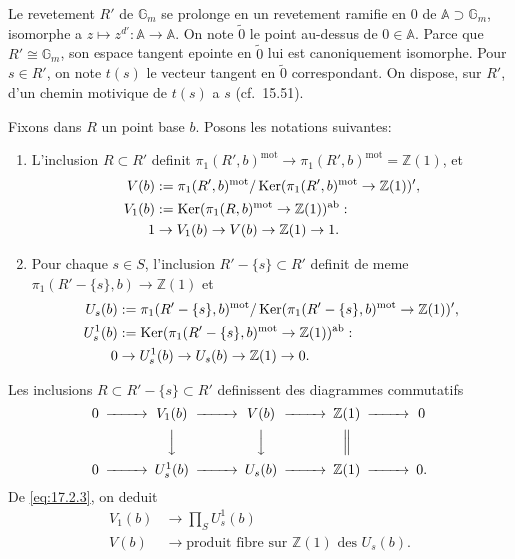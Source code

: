 \documentclass[12pt,a4paper]{article}
\theoremstyle{plain}
\theoremstyle{definition}
\theoremstyle{remark}
\DeclareMathOperator{\Ker}{Ker}
\newcommand{\mot}{\mathrm{mot}}
\newcommand{\Gm}{\mathbb{G}_m}
\newcommand{\ZZ}{\mathbb{Z}}
\newcommand{\GA}{\mathbb{A}}
\begin{document}
Le revetement $R'$ de $\Gm$ se prolonge en un revetement ramifie en
$0$ de $\GA \supset \Gm$, isomorphe a $z \mapsto z^{d'} : \GA \to \GA$.
On note $\tilde{0}$ le point au-dessus de $0 \in \GA$. Parce que
$R' \cong \Gm$, son espace tangent epointe en $\tilde{0}$ lui est
canoniquement isomorphe. Pour $s \in R'$, on note $t(s)$ le vecteur
tangent en $\tilde{0}$ correspondant. On dispose, sur $R'$, d'un chemin
motivique de $t(s)$ a $s$ (cf.\ 15.51).

Fixons dans $R$ un point base $b$. Posons les notations suivantes:
\begin{enumerate}
\item[(a)] L'inclusion $R \subset R'$ definit
$\pi_1(R',b)^\mot \to \pi_1(R',b)^\mot = \ZZ(1)$, et
\begin{align}
V(b) &:= \pi_1(R',b)^\mot/\Ker(\pi_1(R',b)^\mot \to \ZZ(1))', \notag \\
V_1(b) &:= \Ker(\pi_1(R,b)^\mot \to \ZZ(1))^{\mathrm{ab}}: \notag \\
1 &\to V_1(b) \to V(b) \to \ZZ(1) \to 1. \label{eq:17.2.1}
\end{align}
\item[(b)] Pour chaque $s \in S$, l'inclusion $R' - \{s\} \subset R'$
definit de meme $\pi_1(R'-\{s\},b) \to \ZZ(1)$ et
\begin{align}
U_s(b) &:= \pi_1(R'-\{s\},b)^\mot/\Ker(\pi_1(R'-\{s\},b)^\mot \to \ZZ(1))', \notag \\
U_s^1(b) &:= \Ker(\pi_1(R'-\{s\},b)^\mot \to \ZZ(1))^{\mathrm{ab}}: \notag \\
0 &\to U_s^1(b) \to U_s(b) \to \ZZ(1) \to 0. \label{eq:17.2.2}
\end{align}
\end{enumerate}
Les inclusions $R \subset R' - \{s\} \subset R'$ definissent des
diagrammes commutatifs
\begin{equation}\label{eq:17.2.3}
\begin{CD}
0 @>>> V_1(b) @>>> V(b) @>>> \ZZ(1) @>>> 0 \\
@. @VVV @VVV @| \\
0 @>>> U_s^1(b) @>>> U_s(b) @>>> \ZZ(1) @>>> 0.
\end{CD}
\end{equation}
De \eqref{eq:17.2.3}, on deduit
\begin{align}
V_1(b) &\to \prod_S U_s^1(b) \label{eq:17.2.4} \\
V(b) &\to \text{produit fibre sur } \ZZ(1) \text{ des } U_s(b). \label{eq:17.2.5}
\end{align}
\end{document}
